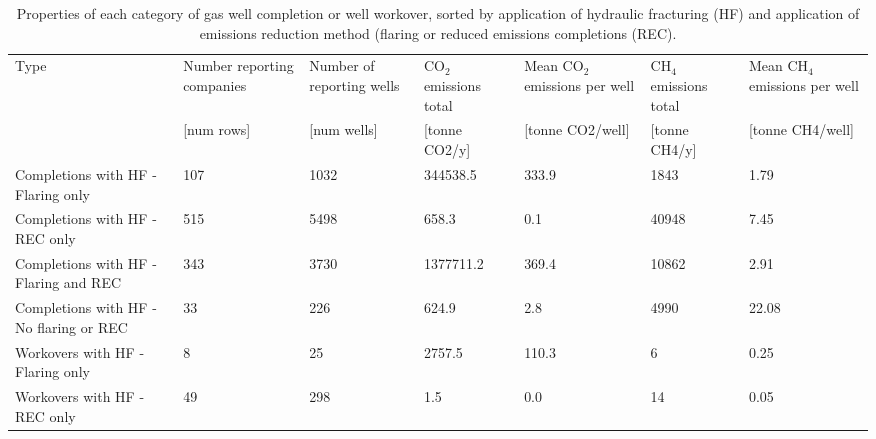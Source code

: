 \documentclass[11pt]{report}
\begin{document}
\begin{landscape}
\begin{table}
\begin{scriptsize}
\caption{Properties of each category of gas well completion or well workover, sorted by application of hydraulic fracturing (HF) and application of emissions reduction method (flaring or reduced emissions completions (REC).}
\label{tab:HF_emissions_table}
\begin{tabular*}{1\columnwidth}{p{}p{}p{}p{}p{}p{}p{}}
\toprule
Type                                                                                                   & Number reporting companies & Number of reporting wells & CO$_2$ emissions total & Mean CO$_2$ emissions per well & CH$_4$ emissions total & Mean CH$_4$ emissions per well \\
                                                                                                       & {[}num rows{]}             & {[}num wells{]}           & {[}tonne CO2/y{]}   & {[}tonne CO2/well{]}   & {[}tonne CH4/y{]}   & {[}tonne CH4/well{]}   \\
\midrule
Completions with HF - Flaring only                              & 107                        & 1032                      & 344538.5            & 333.9                  & 1843                & 1.79                   \\
Completions with HF - REC only              			 & 515                        & 5498                      & 658.3               & 0.1                    & 40948               & 7.45                   \\
Completions with HF - Flaring and REC       		 & 343                        & 3730                      & 1377711.2           & 369.4                  & 10862               & 2.91                   \\
Completions with HF - No flaring or REC 			& 33                         & 226                       & 624.9               & 2.8                    & 4990                & 22.08                  \\
Workovers with HF - Flaring only                                       & 8                          & 25                        & 2757.5              & 110.3                  & 6                   & 0.25                   \\
Workovers with HF - REC only                			& 49                         & 298                       & 1.5                 & 0.0                    & 14                  & 0.05                   \\

\end{tabular*}
\end{scriptsize}
\end{table}
\end{landscape}
\end{document}
